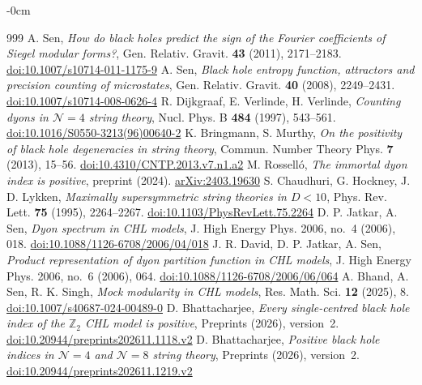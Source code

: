 \documentclass[mathematics,article,submit,pdftex,oneauthor]{Definitions/mdpi}
\numberwithin{equation}{section}
\theoremstyle{plain}
\theoremstyle{remark}
\begin{document}
\begin{adjustwidth}{-\extralength}{0cm}
\begin{thebibliography}{999}
 A. Sen, \emph{How do black holes predict the sign of the Fourier coefficients of Siegel modular forms?}, Gen. Relativ. Gravit. \textbf{43} (2011), 2171--2183. \href{https://doi.org/10.1007/s10714-011-1175-9}{doi:10.1007/s10714-011-1175-9}
 A. Sen, \emph{Black hole entropy function, attractors and precision counting of microstates}, Gen. Relativ. Gravit. \textbf{40} (2008), 2249--2431. \href{https://doi.org/10.1007/s10714-008-0626-4}{doi:10.1007/s10714-008-0626-4}
 R. Dijkgraaf, E. Verlinde, H. Verlinde, \emph{Counting dyons in $\mathcal N=4$ string theory}, Nucl. Phys. B \textbf{484} (1997), 543--561. \href{https://doi.org/10.1016/S0550-3213(96)00640-2}{doi:10.1016/S0550-3213(96)00640-2}
 K. Bringmann, S. Murthy, \emph{On the positivity of black hole degeneracies in string theory}, Commun. Number Theory Phys. \textbf{7} (2013), 15--56. \href{https://doi.org/10.4310/CNTP.2013.v7.n1.a2}{doi:10.4310/CNTP.2013.v7.n1.a2}
 M. Rossell\'o, \emph{The immortal dyon index is positive}, preprint (2024). \href{https://arxiv.org/abs/2403.19630}{arXiv:2403.19630}
 S. Chaudhuri, G. Hockney, J. D. Lykken, \emph{Maximally supersymmetric string theories in $D<10$}, Phys. Rev. Lett. \textbf{75} (1995), 2264--2267. \href{https://doi.org/10.1103/PhysRevLett.75.2264}{doi:10.1103/PhysRevLett.75.2264}
 D. P. Jatkar, A. Sen, \emph{Dyon spectrum in CHL models}, J. High Energy Phys. 2006, no.~4 (2006), 018. \href{https://doi.org/10.1088/1126-6708/2006/04/018}{doi:10.1088/1126-6708/2006/04/018}
 J. R. David, D. P. Jatkar, A. Sen, \emph{Product representation of dyon partition function in CHL models}, J. High Energy Phys. 2006, no.~6 (2006), 064. \href{https://doi.org/10.1088/1126-6708/2006/06/064}{doi:10.1088/1126-6708/2006/06/064}
 A. Bhand, A. Sen, R. K. Singh, \emph{Mock modularity in CHL models}, Res. Math. Sci. \textbf{12} (2025), 8. \href{https://doi.org/10.1007/s40687-024-00489-0}{doi:10.1007/s40687-024-00489-0}
 D. Bhattacharjee, \emph{Every single-centred black hole index of the $\mathbb Z_2$ CHL model is positive}, Preprints (2026), version~2. \href{https://doi.org/10.20944/preprints202611.1118.v2}{doi:10.20944/preprints202611.1118.v2}
 D. Bhattacharjee, \emph{Positive black hole indices in $\mathcal N=4$ and $\mathcal N=8$ string theory}, Preprints (2026), version~2. \href{https://doi.org/10.20944/preprints202611.1219.v2}{doi:10.20944/preprints202611.1219.v2}

\end{thebibliography}
\end{adjustwidth}
\end{document}
